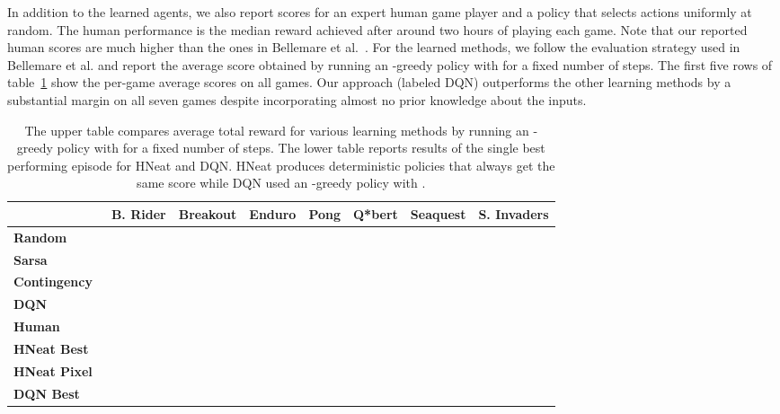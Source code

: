 \documentclass{article} \usepackage{nips13submit_e,times}
\begin{document}
In addition to the learned agents, we also report scores for an expert human game player and a policy that selects actions uniformly at random. The human performance is the median reward achieved after around two hours of playing each game. Note that our reported human scores are much higher than the ones in Bellemare et al.~\cite{bellemare-ale}.  For the learned methods, we follow the evaluation strategy used in Bellemare et al. \cite{bellemare-ale,bellemare:qtf} and report the average score obtained by running an -greedy policy with  for a fixed number of steps. The first five rows of table~\ref{table-results} show the per-game average scores on all games.  Our approach (labeled DQN) outperforms the other learning methods by a substantial margin on all seven games despite incorporating almost no prior knowledge about the inputs.   

\begin{table}
\begin{center}
\begin{tabular}{ |l | c | c | c | c | c | c | c |}
	\hline
	& {\small \textbf{B. Rider}} & {\small \textbf{Breakout}} & {\small \textbf{Enduro}} & {\small \textbf{Pong}} & {\small \textbf{Q*bert}} & {\small \textbf{Seaquest}} & {\small \textbf{S. Invaders}}\\
	\hline
	{\small \textbf{Random}}                                    &  &  &  &  &  &  &  \\
	\hline
	{\small \textbf{Sarsa}~\cite{bellemare-ale}}                &  &  &  &  &  &  &  \\
	\hline
	{\small \textbf{Contingency}~\cite{bellemare-contingency} } &  &  &  &  &  &  &  \\
	\hline
	{\small \textbf{DQN} }                                      &  &  &  &  &  &  &  \\
	\hline
	{\small \textbf{Human} }                                    &  &  &  &  &  &  &  \\
	\hline
	\hline
	{\small \textbf{HNeat Best} \cite{hausknecht-neuro}}        &  &  &  &  &  &  &  \\
	\hline
	{\small \textbf{HNeat Pixel} \cite{hausknecht-neuro}}       &  &  &  &  &  &  &  \\
	\hline
	{\small \textbf{DQN Best}}                                  &  &  &  &  &  &  &  \\
	\hline
\end{tabular}
\caption{\label{table-results} The upper table compares average total reward for various learning methods by running an -greedy policy with  for a fixed number of steps. The lower table reports results of the single best performing episode for HNeat and DQN.  HNeat produces deterministic policies that always get the same score while DQN used an -greedy policy with .}
\end{center}
\end{table}
\end{document}
